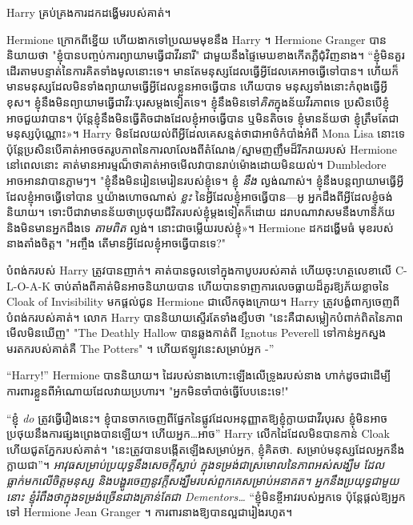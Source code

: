 {{Harry គ្រប់គ្រងការដកដង្ហើមរបស់គាត់។

Hermione ក្រោក​ពី​ខ្នើយ ហើយ​ងាក​ទៅ​ប្រឈម​មុខ​នឹង Harry ។ Hermione Granger បាននិយាយថា "ខ្ញុំបានបញ្ចប់ការព្យាយាមធ្វើជាវីរនារី" ជាមួយនឹងផ្ទៃមេឃខាងកើតភ្លឺជុំវិញនាង។ “ខ្ញុំ​មិន​គួរ​ដើរ​តាម​បន្ទាត់​នៃ​ការ​គិត​ទាំង​មូល​នោះ​ទេ។ មាន​តែ​មនុស្ស​ដែល​ធ្វើ​អ្វី​ដែល​គេ​អាច​ធ្វើ​ទៅ​បាន​។ ហើយ​ក៏​មាន​មនុស្ស​ដែល​មិន​ទាំង​ព្យាយាម​ធ្វើ​អ្វី​ដែល​ខ្លួន​អាច​ធ្វើ​បាន ហើយ​បាទ មនុស្ស​ទាំង​នោះ​កំពុង​ធ្វើ​អ្វី​ខុស។ ខ្ញុំនឹងមិនព្យាយាមធ្វើជាវីរៈបុរសម្តងទៀតទេ។ ខ្ញុំនឹងមិនទៅ\emph{គិត}ក្នុងន័យវីរភាពទេ ប្រសិនបើខ្ញុំអាចជួយវាបាន។ ប៉ុន្តែ​ខ្ញុំ​នឹង​មិន​ធ្វើ​តិច​ជាង​ដែល​ខ្ញុំ​អាច​ធ្វើ​បាន ឬ​មិន​តិច​ទេ ខ្ញុំ​មាន​ន័យ​ថា ខ្ញុំ​ត្រឹម​តែ​ជា​មនុស្ស​ប៉ុណ្ណោះ»។ Harry មិនដែលយល់ពីអ្វីដែលគេសន្មត់ថាជាអាថ៌កំបាំងអំពី Mona Lisa នោះទេ ប៉ុន្តែប្រសិនបើគាត់អាចថតរូបភាពនៃការលាលែងពីតំណែង/ស្នាមញញឹមដ៏រីករាយរបស់ Hermione នៅពេលនោះ គាត់មានអារម្មណ៏ថាគាត់អាចមើលវាបានរាប់ម៉ោងដោយមិនយល់។ Dumbledore អាចអានវាបានភ្លាមៗ។ "ខ្ញុំនឹងមិនរៀនមេរៀនរបស់ខ្ញុំទេ។ ខ្ញុំ \emph{នឹង} ល្ងង់ណាស់។ ខ្ញុំ​នឹង​បន្ត​ព្យាយាម​ធ្វើ​អ្វី​ដែល​ខ្ញុំ​អាច​ធ្វើ​ទៅ​បាន ឬ​យ៉ាង​ហោច​ណាស់ \emph{ខ្លះ} នៃ​អ្វី​ដែល​ខ្ញុំ​អាច​ធ្វើ​បាន—អូ អ្នក​ដឹង​ពី​អ្វី​ដែល​ខ្ញុំ​ចង់​និយាយ។ ទោះបីជាវាមានន័យថាប្រថុយជីវិតរបស់ខ្ញុំម្តងទៀតក៏ដោយ ដរាបណាវាសមនឹងហានិភ័យ និងមិនមានអ្នកដឹងទេ \emph{តាមពិត} ល្ងង់។ នោះ​ជា​ចម្លើយ​របស់​ខ្ញុំ»។ Hermione ដកដង្ហើមធំ មុខរបស់នាងតាំងចិត្ត។ "អញ្ចឹង តើមានអ្វីដែលខ្ញុំអាចធ្វើបានទេ?"

បំពង់ករបស់ Harry ត្រូវបានញាក់។ គាត់បានចូលទៅក្នុងកាបូបរបស់គាត់ ហើយចុះហត្ថលេខាលើ C-L-O-A-K ចាប់តាំងពីគាត់មិនអាចនិយាយបាន ហើយបានទាញការលេចធ្លាយដ៏គួរឱ្យភ័យខ្លាចនៃ Cloak of Invisibility មកផ្តល់ជូន Hermione ជាលើកចុងក្រោយ។ Harry ត្រូវបង្ខំពាក្យចេញពីបំពង់ករបស់គាត់។ លោក Harry បាននិយាយស្ទើរតែទាំងខ្សឹបថា "នេះគឺជាសម្លៀកបំពាក់ពិតនៃភាពមើលមិនឃើញ" "The Deathly Hallow បានឆ្លងកាត់ពី Ignotus Peverell ទៅកាន់អ្នកស្នងមរតករបស់គាត់គឺ The Potters" ។ ហើយឥឡូវនេះសម្រាប់អ្នក -”

“Harry!” Hermione បាននិយាយ។ ដៃរបស់នាងហោះឡើងលើទ្រូងរបស់នាង ហាក់ដូចជាដើម្បីការពារខ្លួនពីអំណោយដែលវាយប្រហារ។ "អ្នកមិនចាំបាច់ធ្វើបែបនេះទេ!"

“ខ្ញុំ \emph{do} ត្រូវធ្វើរឿងនេះ។ ខ្ញុំបានចាកចេញពីផ្នែកនៃផ្លូវដែលអនុញ្ញាតឱ្យខ្ញុំក្លាយជាវីរបុរស ខ្ញុំមិនអាចប្រថុយនឹងការផ្សងព្រេងបានឡើយ។ ហើយអ្នក…អាច” Harry លើកដៃដែលមិនបានកាន់ Cloak ហើយជូតភ្នែករបស់គាត់។ "នេះ​ត្រូវ​បាន​បង្កើត​ឡើង​សម្រាប់​អ្នក, ខ្ញុំ​គិត​ថា. សម្រាប់មនុស្សដែលអ្នកនឹងក្លាយជា”។ \emph{អាវុធសម្រាប់ប្រយុទ្ធនឹងសេចក្តីស្លាប់ ក្នុងទម្រង់ជាស្រមោលនៃភាពអស់សង្ឃឹម ដែលធ្លាក់មកលើចិត្តមនុស្ស និងបង្ហូរចេញនូវក្តីសង្ឃឹមរបស់ពួកគេសម្រាប់អនាគត។ អ្នកនឹងប្រយុទ្ធជាមួយនោះ ខ្ញុំរំពឹងថាក្នុងទម្រង់ច្រើនជាងគ្រាន់តែជា Dementors…} “ខ្ញុំមិនខ្ចីអាវរបស់អ្នកទេ ប៉ុន្តែផ្តល់ឱ្យអ្នកទៅ Hermione Jean Granger ។ ការពារនាងឱ្យបានល្អជារៀងរហូត។

}}
